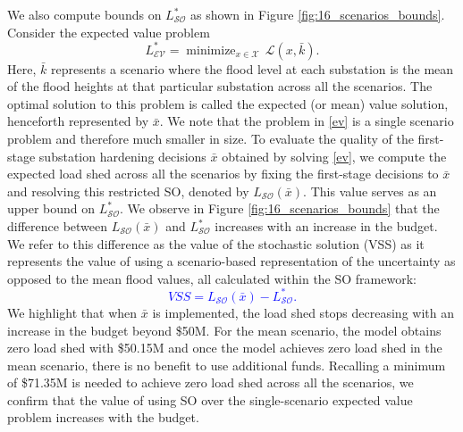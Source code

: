 \documentclass[authoryear,preprint,review,12pt]{elsarticle}\usepackage{amssymb}
\DeclareMathOperator*{\minimize}{minimize}
\begin{document}
We also compute bounds on $L_{\mathcal{SO}}^*$ as shown in Figure \ref{fig:16_scenarios_bounds}. Consider the  expected value problem
\begin{equation}\label{ev}
L_{\mathcal{EV}}^* = \displaystyle{\minimize_{x\in \mathcal{X}} \, \mathcal{L}(x,\bar{k})}.    
\end{equation}
Here, $\bar{k}$ represents a scenario where the flood level at each substation is the mean of the flood heights at that particular substation across all the scenarios. The optimal solution to this problem is called the expected (or mean) value solution, henceforth represented by $\bar{x}$. We note that the problem in \eqref{ev} is a single scenario problem and therefore much smaller in size. 
To evaluate the quality of the first-stage substation hardening decisions $\bar{x}$ obtained by solving \eqref{ev}, we compute the expected load shed across all the scenarios by fixing the first-stage decisions to $\bar{x}$ and resolving this restricted SO, denoted by $L_{\mathcal{SO}}(\bar{x})$. This value serves as an upper bound on $L_{\mathcal{SO}}^*$. 
We observe in Figure \ref{fig:16_scenarios_bounds} that the difference between $L_{\mathcal{SO}}(\bar{x})$ and $L_{\mathcal{SO}}^*$ increases with an increase in the budget. We refer to this difference as the value of the stochastic solution (VSS) as it represents the value of using a scenario-based representation of the uncertainty as opposed to the mean flood values, all calculated within the SO framework:
\textcolor{blue}{
\begin{equation}
    VSS = L_{\mathcal{SO}}(\bar{x}) - L_{\mathcal{SO}}^*. \label{vss}
\end{equation}
}
\noindent We highlight that when $\bar{x}$ is implemented, the load shed stops decreasing with an increase in the budget beyond \$50M. For the mean scenario, the model obtains zero load shed with \$50.15M and once the model achieves zero load shed in the mean scenario, there is no benefit to use additional funds. Recalling a minimum of \$71.35M is needed to achieve zero load shed across all the scenarios, we confirm that the value of using SO over the single-scenario expected value problem increases with the budget.

\end{document}
